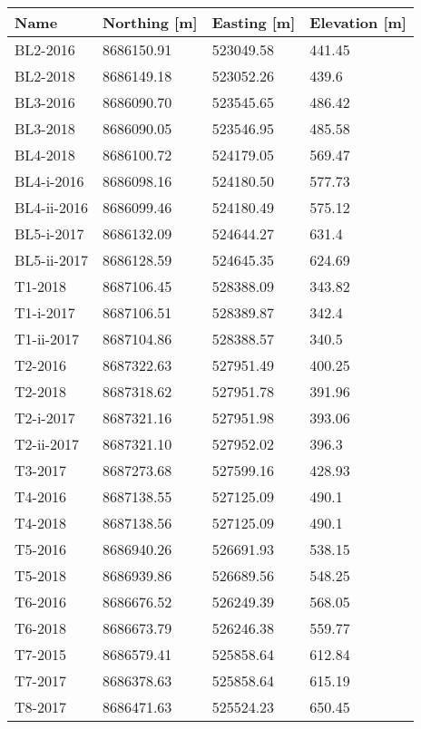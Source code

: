\begin{tabular}{llll}
\toprule
        Name & Northing [m] & Easting [m] & Elevation [m] \\
\midrule
    BL2-2016 &   8686150.91 &   523049.58 &        441.45 \\
    BL2-2018 &   8686149.18 &   523052.26 &         439.6 \\
    BL3-2016 &   8686090.70 &   523545.65 &        486.42 \\
    BL3-2018 &   8686090.05 &   523546.95 &        485.58 \\
    BL4-2018 &   8686100.72 &   524179.05 &        569.47 \\
  BL4-i-2016 &   8686098.16 &   524180.50 &        577.73 \\
 BL4-ii-2016 &   8686099.46 &   524180.49 &        575.12 \\
  BL5-i-2017 &   8686132.09 &   524644.27 &         631.4 \\
 BL5-ii-2017 &   8686128.59 &   524645.35 &        624.69 \\
     T1-2018 &   8687106.45 &   528388.09 &        343.82 \\
   T1-i-2017 &   8687106.51 &   528389.87 &         342.4 \\
  T1-ii-2017 &   8687104.86 &   528388.57 &         340.5 \\
     T2-2016 &   8687322.63 &   527951.49 &        400.25 \\
     T2-2018 &   8687318.62 &   527951.78 &        391.96 \\
   T2-i-2017 &   8687321.16 &   527951.98 &        393.06 \\
  T2-ii-2017 &   8687321.10 &   527952.02 &         396.3 \\
     T3-2017 &   8687273.68 &   527599.16 &        428.93 \\
     T4-2016 &   8687138.55 &   527125.09 &         490.1 \\
     T4-2018 &   8687138.56 &   527125.09 &         490.1 \\
     T5-2016 &   8686940.26 &   526691.93 &        538.15 \\
     T5-2018 &   8686939.86 &   526689.56 &        548.25 \\
     T6-2016 &   8686676.52 &   526249.39 &        568.05 \\
     T6-2018 &   8686673.79 &   526246.38 &        559.77 \\
     T7-2015 &   8686579.41 &   525858.64 &        612.84 \\
     T7-2017 &   8686378.63 &   525858.64 &        615.19 \\
     T8-2017 &   8686471.63 &   525524.23 &        650.45 \\
\bottomrule
\end{tabular}
